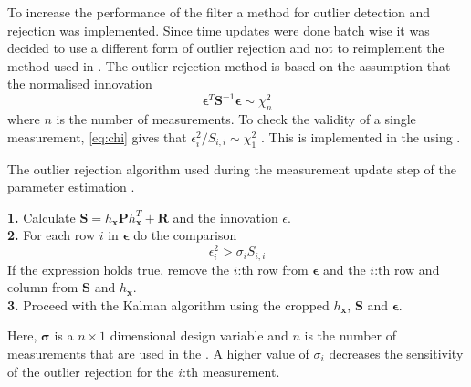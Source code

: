 To increase the performance of the filter a method for outlier detection and rejection was implemented. Since time updates were done batch wise it was decided to use a different form of outlier rejection and not to reimplement the method used in . The outlier rejection method is based on the assumption that the normalised innovation \begin{equation} \label{eq:chi}
\boldsymbol{\epsilon}^T \boldsymbol{S}^{-1} \boldsymbol{\epsilon} \sim \chi_{n}^{2}
\end{equation}
where $n$ is the number of measurements. To check the validity of a single measurement, \eqref{eq:chi} gives that $\epsilon_i^{2}/S_{i,i} \sim \chi_{1}^{2}$ \citep{sensorfusion}. This is implemented in the \abbrEKF using .
\begin{algorithm}[h]
\caption{The outlier rejection algorithm used during the measurement update step of the parameter estimation \abbrEKF.}\label{alg:outlier}
\textbf{1.} Calculate $\boldsymbol{S}=h_{\boldsymbol{x}} \boldsymbol{P} h_{\boldsymbol{x}}^T + \boldsymbol{R}$ and the innovation $\epsilon$.
\\
\textbf{2.} For each row $i$ in $\boldsymbol{\epsilon}$ do the comparison
\begin{equation}
\epsilon_{i}^{2} > \sigma_i S_{i,i}
\end{equation}
If the expression holds true, remove the $i$:th row from $\boldsymbol{\epsilon}$ and the $i$:th row and column from $\boldsymbol{S}$ and $h_{\boldsymbol{x}}$.\\
\textbf{3.} Proceed with the Kalman algorithm using the cropped $h_{\boldsymbol{x}}$, $\boldsymbol{S}$ and $\boldsymbol{\epsilon}$.

Here, $\boldsymbol{\sigma}$ is a $n\times1$ dimensional design variable and $n$ is the number of measurements that are used in the \abbrEKF. A higher value of $\sigma_i$ decreases the sensitivity of the outlier rejection for the $i$:th measurement.
\end{algorithm}


